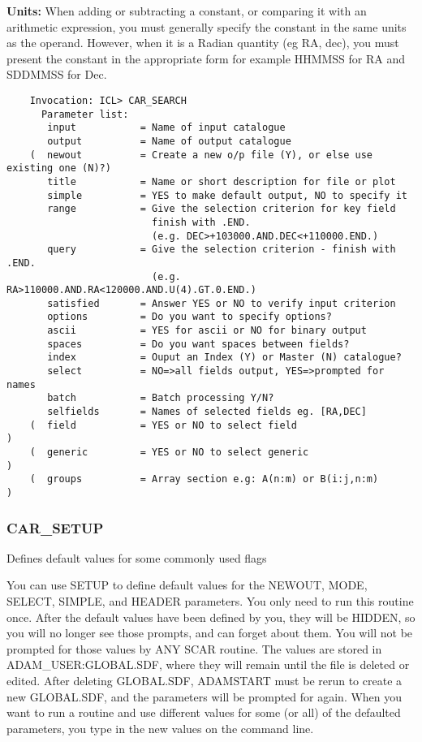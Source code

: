 {\bf Units:} When adding or subtracting a constant, or
comparing it with an arithmetic expression, you must generally specify the
constant in the same units as the operand.
However, when it is a Radian quantity (eg RA, dec), you must present 
the constant in the appropriate form for example HHMMSS for RA
and SDDMMSS for Dec.
\begin{verbatim}
    Invocation: ICL> CAR_SEARCH
      Parameter list:
       input           = Name of input catalogue
       output          = Name of output catalogue
    (  newout          = Create a new o/p file (Y), or else use existing one (N)?)
       title           = Name or short description for file or plot
       simple          = YES to make default output, NO to specify it
       range           = Give the selection criterion for key field 
                         finish with .END.
                         (e.g. DEC>+103000.AND.DEC<+110000.END.)
       query           = Give the selection criterion - finish with .END.
                         (e.g. RA>110000.AND.RA<120000.AND.U(4).GT.0.END.)
       satisfied       = Answer YES or NO to verify input criterion
       options         = Do you want to specify options?
       ascii           = YES for ascii or NO for binary output
       spaces          = Do you want spaces between fields?
       index           = Ouput an Index (Y) or Master (N) catalogue?
       select          = NO=>all fields output, YES=>prompted for names
       batch           = Batch processing Y/N?
       selfields       = Names of selected fields eg. [RA,DEC]
    (  field           = YES or NO to select field                               )
    (  generic         = YES or NO to select generic                             )
    (  groups          = Array section e.g: A(n:m) or B(i:j,n:m)                 )
\end{verbatim}

\subsubsection{CAR\_SETUP}

Defines default values for some commonly used flags

You can use SETUP to define default values for the NEWOUT, MODE, SELECT, 
SIMPLE, and HEADER parameters.
You only need to run this routine once.
After the default values have been defined by you, they will be HIDDEN, so you
will no longer see those prompts, and can forget about them.
You will not be prompted for those values by ANY SCAR routine.
The values are stored in ADAM\_USER:GLOBAL.SDF, where they will remain until
the file is deleted or edited.
After deleting GLOBAL.SDF, ADAMSTART must be rerun to create a new GLOBAL.SDF,
and the parameters will be prompted for again.
When you want to run a routine and use different values for some (or all) of 
the defaulted parameters, you type in the new values on the command line.

